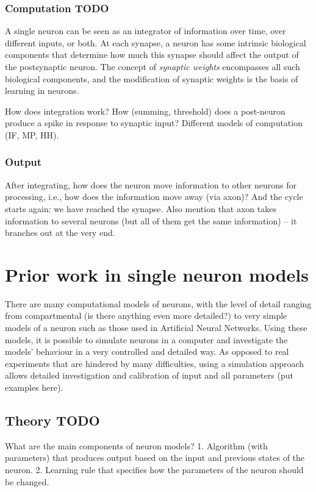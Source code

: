 \documentclass[a4paper,12pt]{report}
\theoremstyle{definition}
\begin{document}
\subsubsection{Computation TODO}
A single neuron can be seen as an integrator of information over time, over different inputs, or both. At each synapse, a neuron has some intrinsic biological components that determine how much this synapse should affect the output of the postsynaptic neuron. The concept of \emph{synaptic weights} encompasses all such biological components, and the modification of synaptic weights is the basis of learning in neurons.

How does integration work? How (summing, threshold) does a post-neuron produce a spike in response to synaptic input? Different models of computation (IF, MP, HH).

\subsubsection{Output}
After integrating, how does the neuron move information to other neurons for processing, i.e., how does the information move away (via axon)? And the cycle starts again: we have reached the synapse. Also mention that axon takes information to several neurons (but all of them get the same information) -- it branches out at the very end.



\section{Prior work in single neuron models}
There are many computational models of neurons, with the level of detail ranging from compartmental (is there anything even more detailed?) to very simple models of a neuron such as those used in Artificial Neural Networks. Using these models, it is possible to simulate neurons in a computer and investigate the models' behaviour in a very controlled and detailed way. As opposed to real experiments that are hindered by many difficulties, using a simulation approach allows detailed investigation and calibration of input and all parameters (put examples here).

\subsection{Theory TODO}
What are the main components of neuron models? 1. Algorithm (with parameters) that produces output based on the input and previous states of the neuron. 2. Learning rule that specifies how the parameters of the neuron should be changed.
\end{document}
